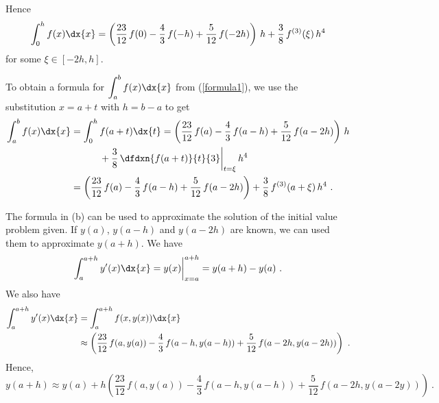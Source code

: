 {Hence
\begin{equation}\label{formula1}
\int_0^h f(x) \dx{x}
= \left(\frac{23}{12}\,f(0) - \frac{4}{3}\,f(-h) +
\frac{5}{12}\,f(-2h)\right)\,h + \frac{3}{8}\,f^{(3)}(\xi)\,h^4
\end{equation}
for some $\xi \in [-2h,h]$.

 To obtain a formula for $\displaystyle \int_a^b f(x)\dx{x}$ from
(\ref{formula1}), we use the substitution $x= a + t$ with $h=b-a$ to get
\begin{align*}
\int_a^b f(x)\dx{x} &= \int_0^h f(a+t) \dx{t}
= \left(\frac{23}{12}\,f(a) - \frac{4}{3}\,f(a-h) +
\frac{5}{12}\,f(a-2h)\right)\,h \\
&\qquad \quad + \frac{3}{8}\,\dfdxn{f(a+t)}{t}{3}\bigg|_{t=\xi} \, h^4 \\
&= \left(\frac{23}{12}\,f(a) - \frac{4}{3}\,f(a-h) +
\frac{5}{12}\,f(a-2h)\right)
+\frac{3}{8}\,f^{(3)}(a+\xi)\,h^4 \ .
\end{align*}

 The formula in (b) can be used to approximate the solution of
the initial value problem given.  If $y(a)$, $y(a-h)$ and
$y(a-2h)$ are known, we can used them to approximate $y(a+h)$.
We have
\[
\int_{a}^{a+h} y'(x) \dx{x} = y(x)\bigg|_{x=a}^{a+h}
= y(a+h) - y(a) \ .
\]
We also have
\begin{align*}
\int_{a}^{a+h} y'(x) \dx{x} &= \int_{a}^{a+h} f(x,y(x)) \dx{x} \\
&\approx \left(\frac{23}{12}\,f(a,y(a)) - \frac{4}{3}\,f(a-h,y(a-h)) +
\frac{5}{12}\,f(a-2h,y(a-2h))\right) \ .
\end{align*}
Hence,
\[
y(a+h) \approx y(a) + h\left(\frac{23}{12}\,f(a,y(a)) -
  \frac{4}{3}\,f(a-h,y(a-h)) + \frac{5}{12}\,f(a-2h,y(a-2y))\right) \ .
\]
}

